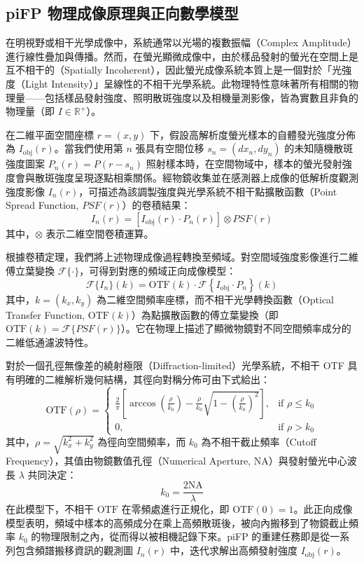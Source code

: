 \subsection{piFP 物理成像原理與正向數學模型}

在明視野或相干光學成像中，系統通常以光場的複數振幅（Complex Amplitude）進行線性疊加與傳播。然而，在螢光顯微成像中，由於樣品發射的螢光在空間上是互不相干的（Spatially Incoherent），因此螢光成像系統本質上是一個對於「光強度（Light Intensity）」呈線性的不相干光學系統。此物理特性意味著所有相關的物理量——包括樣品發射強度、照明散斑強度以及相機量測影像，皆為實數且非負的物理量（即 $I \in \mathbb{R}^+$）。

在二維平面空間座標 $r = (x, y)$ 下，假設高解析度螢光樣本的自體發光強度分佈為 $I_{\text{obj}}(r)$。當我們使用第 $n$ 張具有空間位移 $s_n = (dx_n, dy_n)$ 的未知隨機散斑強度圖案 $P_n(r) = P(r - s_n)$ 照射樣本時，在空間物域中，樣本的螢光發射強度會與散斑強度呈現逐點相乘關係。經物鏡收集並在感測器上成像的低解析度觀測強度影像 $I_n(r)$，可描述為該調製強度與光學系統不相干點擴散函數（Point Spread Function, $PSF(r)$）的卷積結果：
\begin{equation}
    I_n(r) = \left[ I_{\text{obj}}(r) \cdot P_n(r) \right] \otimes PSF(r)
\end{equation}
其中，$\otimes$ 表示二維空間卷積運算。

根據卷積定理，我們將上述物理成像過程轉換至頻域。對空間域強度影像進行二維傅立葉變換 $\mathcal{F}\{\cdot\}$，可得到對應的頻域正向成像模型：
\begin{equation}
    \mathcal{F}\{I_n\}(k) = \text{OTF}(k) \cdot \mathcal{F}\left\{ I_{\text{obj}} \cdot P_n \right\}(k)
\end{equation}
其中，$k = (k_x, k_y)$ 為二維空間頻率座標，而不相干光學轉換函數（Optical Transfer Function, $\text{OTF}(k)$）為點擴散函數的傅立葉變換（即 $\text{OTF}(k) = \mathcal{F}\{PSF(r)\}$）。它在物理上描述了顯微物鏡對不同空間頻率成分的二維低通濾波特性。

對於一個孔徑無像差的繞射極限（Diffraction-limited）光學系統，不相干 OTF 具有明確的二維解析幾何結構，其徑向對稱分佈可由下式給出：
\begin{equation}
    \text{OTF}(\rho) = 
    \begin{cases}
        \frac{2}{\pi} \left[ \arccos\left(\frac{\rho}{k_0}\right) - \frac{\rho}{k_0} \sqrt{1 - \left(\frac{\rho}{k_0}\right)^2} \right], & \text{if } \rho \leq k_0 \\
        0, & \text{if } \rho > k_0
    \end{cases}
\end{equation}
其中，$\rho = \sqrt{k_x^2 + k_y^2}$ 為徑向空間頻率，而 $k_0$ 為不相干截止頻率（Cutoff Frequency），其值由物鏡數值孔徑（Numerical Aperture, $\text{NA}$）與發射螢光中心波長 $\lambda$ 共同決定：
\begin{equation}
    k_0 = \frac{2\text{NA}}{\lambda}
\end{equation}
在此模型下，不相干 $\text{OTF}$ 在零頻處進行正規化，即 $\text{OTF}(0) = 1$。此正向成像模型表明，頻域中樣本的高頻成分在乘上高頻散斑後，被向內搬移到了物鏡截止頻率 $k_0$ 的物理限制之內，從而得以被相機記錄下來。piFP 的重建任務即是從一系列包含頻譜搬移資訊的觀測圖 $I_n(r)$ 中，迭代求解出高頻發射強度 $I_{\text{obj}}(r)$。

